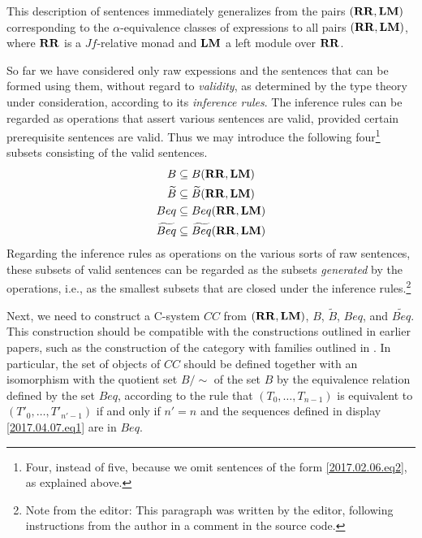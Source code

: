 \documentclass[onecolumn,12pt]{amsart}
\numberwithin{proposition}{subsection}
\newcommand{\wt}{\widetilde}
\newcommand{\RR}{{\bf RR}}
\newcommand{\LM}{{\bf LM}}
\newcommand{\editorfootnote}[1]{\footnote{Note from the editor: #1}}
\begin{document}
This description of sentences immediately generalizes from the pairs
$(\RR,\LM)$ corresponding to the $\alpha$-equivalence classes of expressions to
all pairs $(\RR,\LM)$, where $\RR$ is a $Jf$-relative monad and $\LM$ a left
module over $\RR$.



So far we have considered only raw expessions and the sentences that can be
formed using them, without regard to {\em validity}, as determined by the type
theory under consideration, according to its {\em inference rules}.  The
inference rules can be regarded as operations that assert various sentences are
valid, provided certain prerequisite sentences are valid.  Thus we may introduce
the following four\footnote{Four, instead of five, because we omit sentences of 
the form \ref{2017.02.06.eq2}, as explained above.}
subsets consisting of the valid sentences.
\begin{equation*}
  \begin{split}
    B        & \subseteq B(\RR,\LM) \\
    \wt{B}   & \subseteq \wt{B}(\RR,\LM) \\
    Beq      & \subseteq Beq(\RR,\LM) \\
    \wt{Beq} & \subseteq \wt{Beq}(\RR,\LM)
  \end{split}
\end{equation*}
Regarding the inference rules as operations on the various sorts of raw
sentences, these subsets of valid sentences can be regarded as the subsets {\em
  generated} by the operations, i.e., as the smallest subsets that are closed
under the inference rules.\editorfootnote{This paragraph was written by the
  editor, following instructions from the author in a comment in the source code.}


Next, we need to construct a C-system $CC$ from $(\RR,\LM)$, $B$, $\wt{B}$, $Beq$, and
$\wt{Beq}$.  This construction should be compatible with the
constructions outlined in earlier papers, such as the construction of the
category with families outlined in \cite{Hofmann}. In particular, the set of
objects of $CC$ should be defined together with an isomorphism with the quotient
set $B/{\sim}$ of the set $B$ by the equivalence relation defined by the set
$Beq$, according to the rule that $(T_0,\dots,T_{n-1})$ is equivalent to
$(T'_0,\dots,T'_{n'-1})$ if and only if $n'=n$ and the sequences defined in display \eqref{2017.04.07.eq1} are in $Beq$.
\end{document}
